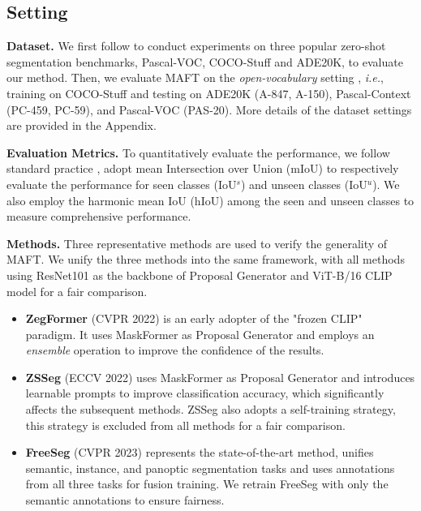 
\subsection{Setting}
\noindent \textbf{Dataset.}
We first follow \cite{zs5, gu2020context, pastore2021closer, zegformer, zsseg} to conduct experiments on three popular zero-shot segmentation benchmarks, Pascal-VOC, COCO-Stuff and ADE20K, to evaluate our method. Then, we evaluate MAFT on the \textit{open-vocabulary} setting \cite{ovseg, zsseg}, \textit{i.e.}, training on COCO-Stuff and testing on ADE20K (A-847, A-150), Pascal-Context (PC-459, PC-59), and Pascal-VOC (PAS-20). More details of the dataset settings are provided in the Appendix.

\noindent \textbf{Evaluation Metrics.}
To quantitatively evaluate the performance, we follow standard practice \cite{zs5, spnet, cagnet, STRICT, zegformer, zsseg, freeseg}, adopt mean Intersection over Union (mIoU) to respectively evaluate the performance for seen classes (IoU$^s$) and unseen classes (IoU$^u$). We also employ the harmonic mean IoU (hIoU) among the seen and unseen classes to measure comprehensive performance.

\noindent \textbf{Methods.}
Three representative methods are used to verify the generality of MAFT. We unify the three methods into the same framework, with all methods using ResNet101 as the backbone of Proposal Generator and ViT-B/16 CLIP model for a fair comparison.

\begin{itemize}[itemsep=2pt,topsep=0pt,parsep=0pt]
\item \textbf{ZegFormer} (CVPR 2022) \cite{zegformer} is an early adopter of the "frozen CLIP" paradigm. It uses MaskFormer as Proposal Generator and employs an \textit{ensemble} operation to improve the confidence of the results.
\item \textbf{ZSSeg} (ECCV 2022) \cite{zsseg} uses MaskFormer as Proposal Generator and introduces learnable prompts to improve classification accuracy, which significantly affects the subsequent methods. ZSSeg also adopts a self-training strategy, this strategy is excluded from all methods for a fair comparison.
\item \textbf{FreeSeg} (CVPR 2023) \cite{freeseg} represents the state-of-the-art method, unifies semantic, instance, and panoptic segmentation tasks and uses annotations from all three tasks for fusion training. We retrain FreeSeg with only the semantic annotations to ensure fairness.
\end{itemize}

